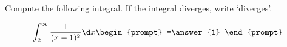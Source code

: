 \documentclass{ximera}
\author{Gregory Hartman \and Matthew Carr}
\begin{document}
\begin{exercise}




Compute the following integral. If the integral diverges, write `diverges'.

\[
\int_{2}^{\infty}\frac{1}{(x-1)^2}\d x
\begin{prompt}
=\answer{1}
\end{prompt}
\]

\end{exercise}
\end{document}
